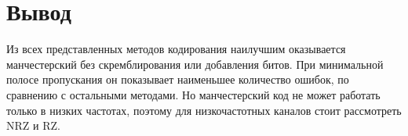 \section{Вывод}
Из всех представленных методов кодирования наилучшим оказывается манчестерский без скремблирования или добавления битов.
При минимальной полосе пропускания он показывает наименьшее количество ошибок, по сравнению с остальными методами.
Но манчестерский код не может работать только в низких частотах,
поэтому для низкочастотных каналов стоит рассмотреть NRZ и RZ.
